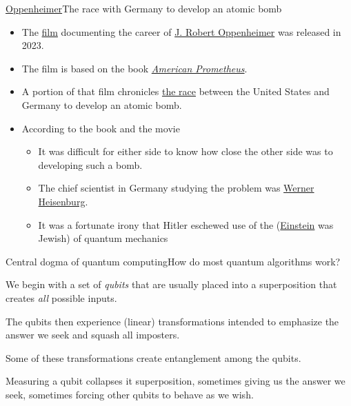 \begin{frame}{\href{https://en.wikipedia.org/wiki/Oppenheimer\_(film)}{Oppenheimer}}{The race with Germany to develop an atomic bomb}
\begin{itemize}
    \item The \href{https://en.wikipedia.org/wiki/Oppenheimer_(film)}{film} documenting the career of \href{https://en.wikipedia.org/wiki/J.\_Robert\_Oppenheimer}{J. Robert Oppenheimer} was released in 2023.
    \item The film is based on the book \href{https://en.wikipedia.org/wiki/American\_Prometheus}{\textit{American Prometheus}}.
    \item A portion of that film chronicles \href{https://www.osti.gov/opennet/manhattan-project-history/Events/1942-1945/rivals.htm}{the race} between the United States and Germany to develop an atomic bomb.
    \item According to the book and the movie
    \begin{itemize}
        \item It was difficult for either side to know how close the other side was to developing such a bomb.
        \item The chief scientist in Germany studying the problem was \href{https://en.wikipedia.org/wiki/Werner\_Heisenberg}{Werner Heisenburg}.
        \item It was a fortunate irony that Hitler eschewed use of the  (\href{https://en.wikipedia.org/wiki/Albert_Einstein}{Einstein} was Jewish) of quantum mechanics 
    \end{itemize}
\end{itemize}
\end{frame}

\begin{frame}{Central dogma of quantum computing}{How do most quantum algorithms work?}
\begin{description}
    \item<1->[Input] We begin with a set of \emph{qubits} that are usually placed into a superposition that creates \emph{all} possible inputs. 
    \item<2->[Gates] The qubits then experience (linear) transformations intended to emphasize the answer we seek and squash all imposters.  
    
    Some of these transformations create entanglement among the qubits.
    \item<3->[Measurement] Measuring a qubit collapses it superposition, sometimes giving us the answer we seek, sometimes forcing other qubits to behave as we wish.
\end{description}
    
\end{frame}



